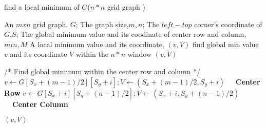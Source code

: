 \documentclass[UTF8,a4paper]{article}
\begin{document}
	\begin{algorithm}[htb]
		\caption{find a local minimum of $G$($ n * n $ grid graph )}
		\begin{algorithmic}[1]
			\Require
				An $ m x n $ grid graph, $ G $;
				The graph size,$ m,n $;
				The $ left-top $ corner's coordinate of $ G $,$ S $;
				The global minimum value and its coodinate of center row and column,$ min,M $
			\Ensure
				A local minimum value and its coordinate, $ (v,V) $
					\State find global min value $v$ and its coordinate $V$ within the $ n * n $ window
					\State \Return $(v,V)$
				\EndIf
				
				\State /* Find global minimum within the center row and column */
						$ v \gets G[S_{x}+(m-1)/2][S_{y}+i]; V \gets (S_{x}+(m-1)/2,S_{y}+i) $ 
					\EndIf\textbf{\color{red}\ \  Center Row}
				\EndFor
						$ v \gets G[S_{x}+i][S_{y}+(n-1)/2]; V \gets (S_{x}+i,S_{y}+(n-1)/2) $ 
					\EndIf\textbf{\color{red}\ \ Center Column}
				\EndFor
		
					\State \Return $ (v,V) $
				\EndIf
				

\end{algorithmic}
\end{algorithm}
\end{document}
